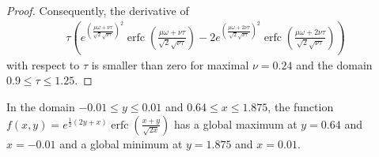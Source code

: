 \documentclass{article}
\renewcommand{\leq}{\leqslant}
\DeclareMathOperator{\erfc}{erfc}
\begin{document}
\begin{proof}
{Consequently}, the derivative of
\begin{align}
\label{eq:subx1b}
\tau \left(e^{\left(\frac{\mu \omega+\nu \tau}{\sqrt{2} \sqrt{\nu \tau}}\right)^2} \erfc \left(\frac{\mu \omega+\nu \tau}{\sqrt{2} \sqrt{\nu \tau}}\right)-2 e^{\left(\frac{\mu \omega+2  \nu \tau}{\sqrt{2} \sqrt{\nu \tau}}\right)^2} \erfc \left(\frac{\mu \omega+2  \nu \tau}{\sqrt{2} \sqrt{\nu \tau}}\right)\right)
\end{align}
with respect to $\tau$ is smaller than zero for maximal
$\nu = 0.24$ and the domain $0.9 \leq \tau \leq 1.25$.
\end{proof}


\begin{lemma}
\label{lem:mainsubfunctionJ11J12}
In the domain $-0.01 \leq y \leq 0.01$ and $0.64 \leq x \leq 1.875$, 
the function $f(x,y)=e^{\frac{1}{2} (2 y + x)} \erfc\left(\frac{x+y}{\sqrt{2 x}}\right)$ has a global 
maximum at $y=0.64$ and $x=-0.01$ and a global minimum at $y=1.875$ and $x=0.01$. 
\end{lemma}
\end{document}
